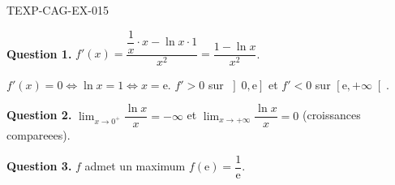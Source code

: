 \begin{corrige}{TEXP-CAG-EX-015}

\textbf{Question 1.} $f'(x) = \dfrac{\dfrac{1}{x} \cdot x - \ln x \cdot 1}{x^2} = \dfrac{1 - \ln x}{x^2}$.


$f'(x) = 0 \iff \ln x = 1 \iff x = \mathrm{e}$. $f' > 0$ sur $\left]0, \mathrm{e}\right]$ et $f' < 0$ sur $\left[\mathrm{e}, +\infty\right[$.

\textbf{Question 2.} $\lim_{x \to 0^+} \dfrac{\ln x}{x} = -\infty$ et $\lim_{x \to +\infty} \dfrac{\ln x}{x} = 0$ (croissances compareees).

\textbf{Question 3.} $f$ admet un maximum $f(\mathrm{e}) = \dfrac{1}{\mathrm{e}}$.

\end{corrige}
